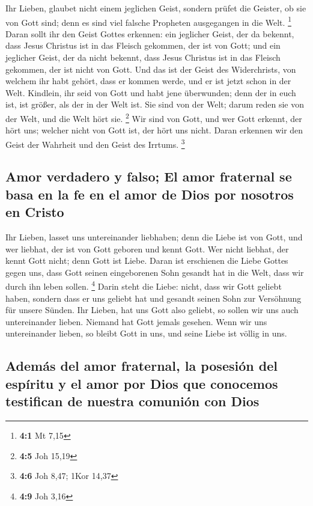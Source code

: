  Ihr Lieben, glaubet nicht einem jeglichen Geist, sondern
prüfet die Geister, ob sie von Gott sind; denn es sind viel falsche
Propheten ausgegangen in die Welt. \footnote{\textbf{4:1} Mt 7,15}
 Daran sollt ihr den Geist Gottes erkennen: ein jeglicher
Geist, der da bekennt, dass Jesus Christus ist in das Fleisch gekommen,
der ist von Gott;  und ein jeglicher Geist, der da nicht
bekennt, dass Jesus Christus ist in das Fleisch gekommen, der ist nicht
von Gott. Und das ist der Geist des Widerchrists, von welchem ihr habt
gehört, dass er kommen werde, und er ist jetzt schon in der Welt.
 Kindlein, ihr seid von Gott und habt jene überwunden;
denn der in euch ist, ist größer, als der in der Welt ist.
 Sie sind von der Welt; darum reden sie von der Welt, und
die Welt hört sie. \footnote{\textbf{4:5} Joh 15,19}  Wir
sind von Gott, und wer Gott erkennt, der hört uns; welcher nicht von
Gott ist, der hört uns nicht. Daran erkennen wir den Geist der Wahrheit
und den Geist des Irrtums. \footnote{\textbf{4:6} Joh 8,47; 1Kor 14,37}

\hypertarget{amor-verdadero-y-falso-el-amor-fraternal-se-basa-en-la-fe-en-el-amor-de-dios-por-nosotros-en-cristo}{%
\subsection{Amor verdadero y falso; El amor fraternal se basa en la fe
en el amor de Dios por nosotros en
Cristo}\label{amor-verdadero-y-falso-el-amor-fraternal-se-basa-en-la-fe-en-el-amor-de-dios-por-nosotros-en-cristo}}

 Ihr Lieben, lasset uns untereinander liebhaben; denn die
Liebe ist von Gott, und wer liebhat, der ist von Gott geboren und kennt
Gott.  Wer nicht liebhat, der kennt Gott nicht; denn Gott
ist Liebe.  Daran ist erschienen die Liebe Gottes gegen
uns, dass Gott seinen eingeborenen Sohn gesandt hat in die Welt, dass
wir durch ihn leben sollen. \footnote{\textbf{4:9} Joh 3,16}
 Darin steht die Liebe: nicht, dass wir Gott geliebt
haben, sondern dass er uns geliebt hat und gesandt seinen Sohn zur
Versöhnung für unsere Sünden.  Ihr Lieben, hat uns Gott
also geliebt, so sollen wir uns auch untereinander lieben.
 Niemand hat Gott jemals gesehen. Wenn wir uns
untereinander lieben, so bleibt Gott in uns, und seine Liebe ist völlig
in uns.

\hypertarget{ademuxe1s-del-amor-fraternal-la-posesiuxf3n-del-espuxedritu-y-el-amor-por-dios-que-conocemos-testifican-de-nuestra-comuniuxf3n-con-dios}{%
\subsection{Además del amor fraternal, la posesión del espíritu y el
amor por Dios que conocemos testifican de nuestra comunión con
Dios}\label{ademuxe1s-del-amor-fraternal-la-posesiuxf3n-del-espuxedritu-y-el-amor-por-dios-que-conocemos-testifican-de-nuestra-comuniuxf3n-con-dios}}

